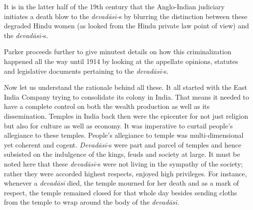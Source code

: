{It is in the latter half of the 19th century that the Anglo-Indian judiciary initiates a death blow to the \textit{devadāsī-}s by blurring the distinction between these degraded Hindu women (as looked from the Hindu private law point of view) and the \textit{devadāsī-}s.

Parker proceeds further to give minutest details on how this criminalization happened all the way until 1914 by looking at the appellate opinions, statutes and legislative documents pertaining to the \textit{devadāsī-}s.

Now let us understand the rationale behind all these. It all started with the East India Company trying to consolidate its colony in India. That means it needed to have a complete control on both the wealth production as well as its dissemination. Temples in India back then were the epicenter for not just religion but also for culture as well as economy. It was imperative to curtail people’s allegiance to these temples. People’s allegiance to temple was multi-dimensional yet coherent and cogent. \textit{Devadāsī-}s were part and parcel of temples and hence subsisted on the indulgence of the kings, feuds and society at large. It must be noted here that these \textit{devadāsī-}s were not living in the sympathy of the society; rather they were accorded highest respects, enjoyed high privileges. For instance, whenever a \textit{devadāsī }died, the temple mourned for her death and as a mark of respect, the temple remained closed for that whole day besides sending cloths from the temple to wrap around the body of the \textit{devadāsī.}

}
